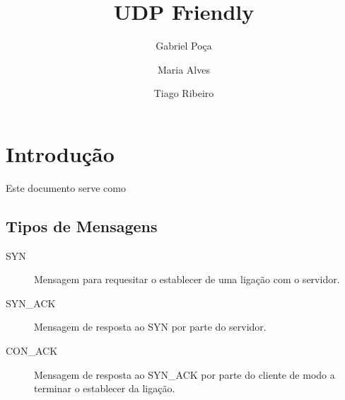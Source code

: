 \documentclass{llncs}
\begin{document}
\mainmatter
\title{UDP Friendly}


\author{Gabriel Poça \and Maria Alves \and Tiago Ribeiro}



\date{}


\maketitle

\section{Introdução}
Este documento serve como

\subsection{Tipos de Mensagens}
\begin{description}
	\item[SYN] Mensagem para requesitar o establecer de uma ligação com o servidor.
	\item[SYN\_ACK] Mensagem de resposta ao SYN por parte do servidor.
	\item[CON\_ACK] Mensagem de resposta ao SYN_ACK por parte do cliente de modo a terminar o establecer da ligação.
\end{description}


\end{document}
